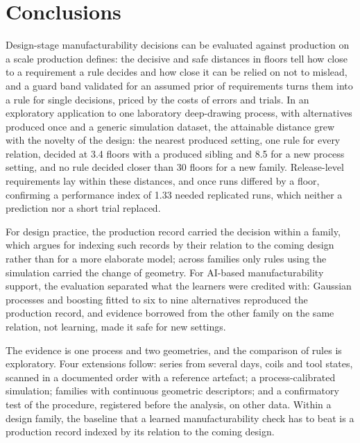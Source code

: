 \documentclass[pdflatex,sn-basic,lineno]{sn-jnl}
\begin{document}
\section{Conclusions}\label{sec:conclusion}

Design-stage manufacturability decisions can be evaluated against production on a scale production defines: the decisive and safe distances in floors tell how close to a requirement a rule decides and how close it can be relied on not to mislead, and a guard band validated for an assumed prior of requirements turns them into a rule for single decisions, priced by the costs of errors and trials. In an exploratory application to one laboratory deep-drawing process, with alternatives produced once and a generic simulation dataset, the attainable distance grew with the novelty of the design: the nearest produced setting, one rule for every relation, decided at 3.4 floors with a produced sibling and 8.5 for a new process setting, and no rule decided closer than 30 floors for a new family. Release-level requirements lay within these distances, and once runs differed by a floor, confirming a performance index of 1.33 needed replicated runs, which neither a prediction nor a short trial replaced.

For design practice, the production record carried the decision within a family, which argues for indexing such records by their relation to the coming design rather than for a more elaborate model; across families only rules using the simulation carried the change of geometry. For AI-based manufacturability support, the evaluation separated what the learners were credited with: Gaussian processes and boosting fitted to six to nine alternatives reproduced the production record, and evidence borrowed from the other family on the same relation, not learning, made it safe for new settings.

The evidence is one process and two geometries, and the comparison of rules is exploratory. Four extensions follow: series from several days, coils and tool states, scanned in a documented order with a reference artefact; a process-calibrated simulation; families with continuous geometric descriptors; and a confirmatory test of the procedure, registered before the analysis, on other data. Within a design family, the baseline that a learned manufacturability check has to beat is a production record indexed by its relation to the coming design.


\backmatter
\end{document}
